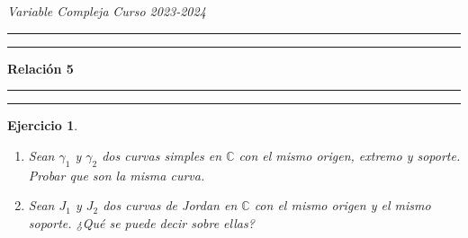 \documentclass[11pt]{report}
\newcommand{\C}{\mathbb C}
\newtheorem{exercise}{Ejercicio}
\begin{document}


\textit{Variable Compleja} \hfill \textit{Curso 2023-2024}

\vspace{-5mm}

\begin{center}

	\rule{\textwidth}{1.6pt}\vspace*{-\baselineskip}\vspace*{2pt} %
	\rule{\textwidth}{0.4pt} %
	
	{\LARGE \textbf{Relación 5}} %
	
	\rule[0.66\baselineskip]{\textwidth}{0.4pt}\vspace*{-\baselineskip}\vspace{3.2pt} %
	\rule[0.66\baselineskip]{\textwidth}{1.6pt} %

\end{center}


\begin{exercise}
\hfill
\begin{enumerate}
    \item Sean $\gamma_1$ y $\gamma_2$ dos curvas simples en $\C$ con el mismo origen, extremo y soporte. Probar que son la misma curva.
    \item Sean $J_1$ y $J_2$ dos curvas de Jordan en $\C$ con el mismo origen y el mismo soporte. ¿Qué se puede decir sobre ellas?
\end{enumerate}
\end{exercise}
\end{document}
